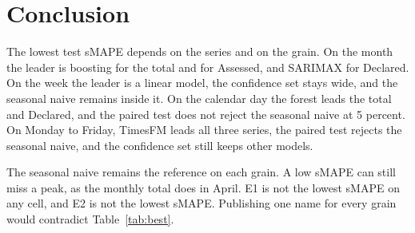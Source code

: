 \section{Conclusion}
\label{sec:conclusion}

The lowest test sMAPE depends on the series and on the grain.
On the month the leader is boosting for the total and for Assessed, and SARIMAX for Declared.
On the week the leader is a linear model, the confidence set stays wide, and the seasonal naive remains inside it.
On the calendar day the forest leads the total and Declared, and the paired test does not reject the seasonal naive at 5 percent.
On Monday to Friday, TimesFM leads all three series, the paired test rejects the seasonal naive, and the confidence set still keeps other models.

The seasonal naive remains the reference on each grain.
A low sMAPE can still miss a peak, as the monthly total does in April.
E1 is not the lowest sMAPE on any cell, and E2 is not the lowest sMAPE.
Publishing one name for every grain would contradict Table~\ref{tab:best}.

